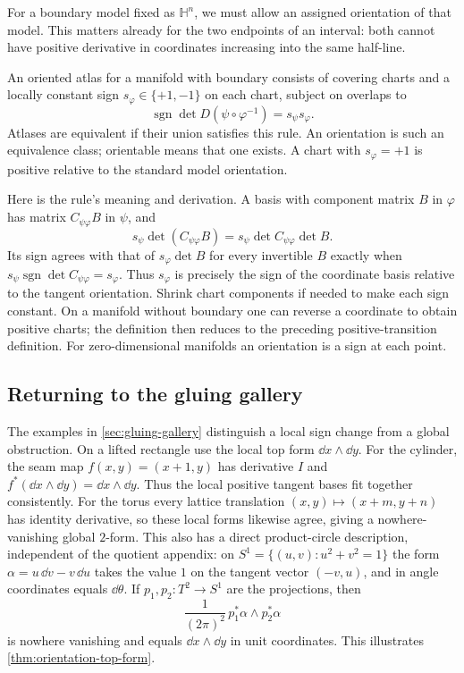 For a boundary model fixed as $\mathbb H^n$, we must allow an assigned
orientation of that model. This matters already for the two endpoints
of an interval: both cannot have positive derivative in coordinates
increasing into the same half-line.
\begin{definition}
An oriented atlas for a manifold with boundary consists of covering charts
and a locally constant sign $s_\varphi\in\{+1,-1\}$ on each chart,
subject on overlaps to
\[
\boxed{\operatorname{sgn}\det D(\psi\circ\varphi^{-1})=s_\psi s_\varphi.}
\]
Atlases are equivalent if their union satisfies this rule. An orientation
is such an equivalence class; orientable means that one exists. A chart
with $s_\varphi=+1$ is positive relative to the standard model orientation.
\end{definition}
Here is the rule's meaning and derivation. A basis with component matrix
$B$ in $\varphi$ has matrix $C_{\psi\varphi}B$ in $\psi$, and
\[
s_\psi\det(C_{\psi\varphi}B)
=s_\psi\det C_{\psi\varphi}\det B.
\]
Its sign agrees with that of $s_\varphi\det B$ for every invertible $B$
exactly when $s_\psi\operatorname{sgn}\det C_{\psi\varphi}=s_\varphi$.
Thus $s_\varphi$ is precisely the sign of the coordinate basis relative
to the tangent orientation.
Shrink chart
components if needed to make each sign constant. On a manifold without
boundary one can reverse a coordinate to obtain positive charts; the
definition then reduces to the preceding positive-transition definition.
For zero-dimensional manifolds an orientation is a sign at each point.

\subsection{Returning to the gluing gallery}
The examples in \cref{sec:gluing-gallery} distinguish a local sign change
from a global obstruction. On a lifted rectangle use the local top form
$\dd x\wedge\dd y$.
For the cylinder, the seam map $f(x,y)=(x+1,y)$ has derivative $I$ and
$f^*(\dd x\wedge\dd y)=\dd x\wedge\dd y$.
Thus the local positive tangent bases fit together consistently.
For the torus every lattice translation $(x,y)\mapsto(x+m,y+n)$ has
identity derivative, so these local forms likewise agree, giving a
nowhere-vanishing global $2$-form. This also has a direct product-circle
description, independent of the quotient appendix: on
$S^1=\{(u,v):u^2+v^2=1\}$ the form
$\alpha=u\,\dd v-v\,\dd u$ takes the value $1$ on the tangent vector
$(-v,u)$, and in angle coordinates equals $\dd\theta$.
If $p_1,p_2:T^2\to S^1$ are the projections, then
\[
\frac1{(2\pi)^2}\,p_1^*\alpha\wedge p_2^*\alpha
\]
is nowhere vanishing and equals $\dd x\wedge\dd y$ in unit coordinates.
This illustrates \cref{thm:orientation-top-form}.

